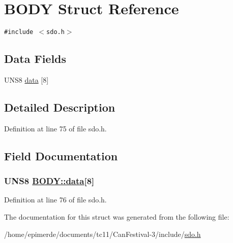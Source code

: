 \hypertarget{structBODY}{
\section{BODY Struct Reference}
\label{structBODY}
}
{\tt \#include $<$sdo.h$>$}

\subsection*{Data Fields}
\begin{CompactItemize}
\item 
UNS8 \hyperlink{structBODY_e1c3d89411eb0266a1db691b5de561d9}{data} \mbox{[}8\mbox{]}
\end{CompactItemize}


\subsection{Detailed Description}




Definition at line 75 of file sdo.h.

\subsection{Field Documentation}
\hypertarget{structBODY_e1c3d89411eb0266a1db691b5de561d9}{
\subsubsection[data]{\setlength{\rightskip}{0pt plus 5cm}UNS8 \hyperlink{structBODY_e1c3d89411eb0266a1db691b5de561d9}{BODY::data}\mbox{[}8\mbox{]}}}
\label{structBODY_e1c3d89411eb0266a1db691b5de561d9}




Definition at line 76 of file sdo.h.

The documentation for this struct was generated from the following file:\begin{CompactItemize}
\item 
/home/epimerde/documents/tc11/Can\-Festival-3/include/\hyperlink{sdo_8h}{sdo.h}\end{CompactItemize}
